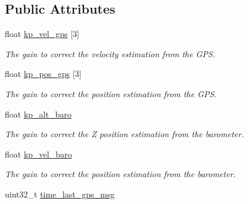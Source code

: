 \subsection*{Public Attributes}
\begin{DoxyCompactItemize}
\item 
\hypertarget{structposition__estimator__t_ad23883e9e58974a278f50986e4fa0f81}{float \hyperlink{structposition__estimator__t_ad23883e9e58974a278f50986e4fa0f81}{kp\+\_\+vel\+\_\+gps} \mbox{[}3\mbox{]}}\label{structposition__estimator__t_ad23883e9e58974a278f50986e4fa0f81}

\begin{DoxyCompactList}\small\item\em The gain to correct the velocity estimation from the G\+P\+S. \end{DoxyCompactList}\item 
\hypertarget{structposition__estimator__t_a222ab6218c59bec880f29d01440d79b5}{float \hyperlink{structposition__estimator__t_a222ab6218c59bec880f29d01440d79b5}{kp\+\_\+pos\+\_\+gps} \mbox{[}3\mbox{]}}\label{structposition__estimator__t_a222ab6218c59bec880f29d01440d79b5}

\begin{DoxyCompactList}\small\item\em The gain to correct the position estimation from the G\+P\+S. \end{DoxyCompactList}\item 
\hypertarget{structposition__estimator__t_a02389002f78a066386ff811cfa680e9d}{float \hyperlink{structposition__estimator__t_a02389002f78a066386ff811cfa680e9d}{kp\+\_\+alt\+\_\+baro}}\label{structposition__estimator__t_a02389002f78a066386ff811cfa680e9d}

\begin{DoxyCompactList}\small\item\em The gain to correct the Z position estimation from the barometer. \end{DoxyCompactList}\item 
\hypertarget{structposition__estimator__t_aabea5786d2706ac225154cc56955e047}{float \hyperlink{structposition__estimator__t_aabea5786d2706ac225154cc56955e047}{kp\+\_\+vel\+\_\+baro}}\label{structposition__estimator__t_aabea5786d2706ac225154cc56955e047}

\begin{DoxyCompactList}\small\item\em The gain to correct the position estimation from the barometer. \end{DoxyCompactList}\item 
\hypertarget{structposition__estimator__t_af881615b518416dacef19c5aa147b641}{uint32\+\_\+t \hyperlink{structposition__estimator__t_af881615b518416dacef19c5aa147b641}{time\+\_\+last\+\_\+gps\+\_\+msg}}\label{structposition__estimator__t_af881615b518416dacef19c5aa147b641}


\end{DoxyCompactItemize}
